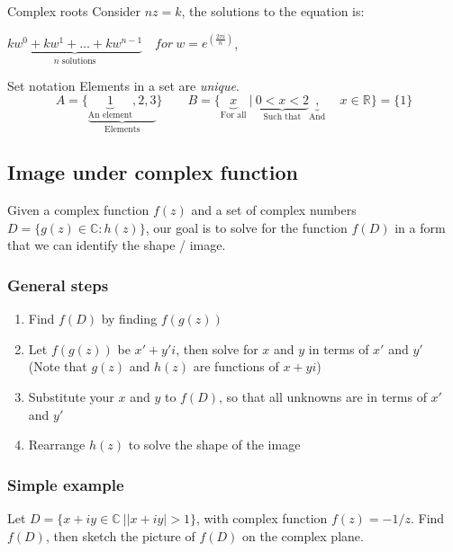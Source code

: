 \documentclass{article}
\begin{document}
\begin{definition}[]{Complex roots}
    Consider $nz=k$, the solutions to the equation is:

    $\underbrace{kw^0 + kw^1 + \dots + kw^{n-1}}_{n\text{ solutions}}\quad for\ w = e^(\frac{2\pi i}{n})$,
\end{definition}

\begin{knBox}[]{Set notation}
    Elements in a set are \emph{unique}.
    \[A=\{\underbrace{\underbrace{1}_{\text{An element}},2,3}_{\text{Elements}}\}\quad\quad B=\{\underbrace{x}_{\text{For all}}\ |\ \underbrace{0<x<2}_{\text{Such that}}\underbrace{,}_{\text{And}}\quad x\in\mathds{R}\}=\{1\}\]
\end{knBox}

\subsection{Image under complex function}
Given a complex function $f(z)$ and a set of complex numbers $D=\{g(z)\in \mathds{C}:h(z)\}$, our goal is to solve for the function $f(D)$ in a form that we can identify the shape / image.

\subsubsection{General steps}
\begin{enumerate}
    \item Find $f(D)$ by finding $f(g(z))$
    \item Let $f(g(z))$ be $x'+y'i$, then solve for $x$ and $y$ in terms of $x'$ and $y'$ \\(Note that $g(z)$ and $h(z)$ are functions of $x+yi$)
    \item Substitute your $x$ and $y$ to $f(D)$, so that all unknowns are in terms of $x'$ and $y'$
    \item Rearrange $h(z)$ to solve the shape of the image
\end{enumerate}

\subsubsection{Simple example}
Let $D=\{x+iy \in \mathds{C}\ | |x+iy|>1\}$, with complex function $f(z)=-1/z$. Find $f(D)$, then sketch the picture of $f(D)$ on the complex plane. 
\end{document}
